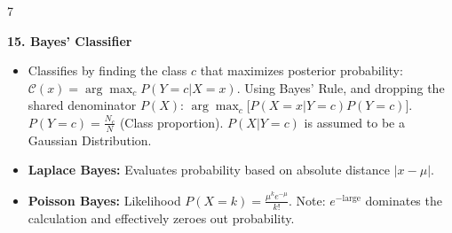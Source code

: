 \documentclass{article}
\newcommand{\hlhighlight}[1]{\par\vspace{1.5pt}\noindent\colorbox{yellow!50}{\parbox{\dimexpr\columnwidth-2\fboxsep\relax}{\textbf{#1}}}\par\vspace{0.5pt}}
\newcommand{\sectitle}[1]{\par\textbf{\color{blue!70!black}{#1}}\par}
\newcommand{\lbl}[1]{\textcolor{green!60!black}{\textbf{#1}}}
\begin{document}
\begin{multicols}{7}
\hlhighlight{15. Bayes' Classifier}
\sectitle{Probabilistic Decision}
\begin{itemize}
    \item Classifies by finding the class $c$ that maximizes posterior probability: $\mathcal{C}(x) = \arg\max_c P(Y=c | X=x)$. Using Bayes' Rule, and dropping the shared denominator $P(X)$: $\arg\max_c \Big[ P(X=x | Y=c) P(Y=c) \Big]$. $P(Y=c) = \frac{N_c}{N}$ (Class proportion). $P(X|Y=c)$ is assumed to be a Gaussian Distribution.
    \item \lbl{Laplace Bayes:} Evaluates probability based on absolute distance $|x-\mu|$.
    \item \lbl{Poisson Bayes:} Likelihood $P(X=k) = \frac{\mu^k e^{-\mu}}{k!}$. Note: $e^{-\text{large}}$ dominates the calculation and effectively zeroes out probability.
\end{itemize}


\end{multicols}
\end{document}
